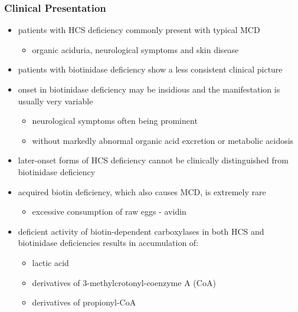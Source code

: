 \documentclass{scrartcl}
\begin{document}
\subsubsection{Clinical Presentation}
\label{sec:orgd598a20}
\begin{itemize}
\item patients with HCS deficiency commonly present with typical MCD
\begin{itemize}
\item organic aciduria, neurological symptoms and skin
disease
\end{itemize}
\item patients with biotinidase deficiency show a less consistent clinical
picture
\item onset in biotinidase deficiency may be insidious and the
manifestation is usually very variable
\begin{itemize}
\item neurological symptoms often being prominent
\item without markedly abnormal organic acid excretion or metabolic
acidosis
\end{itemize}
\item later-onset forms of HCS deficiency cannot be clinically
distinguished from biotinidase deficiency

\item acquired biotin deficiency, which also causes MCD, is extremely rare
\begin{itemize}
\item excessive consumption of raw eggs - avidin
\end{itemize}

\item deficient activity of biotin-dependent carboxylases in both HCS and
biotinidase deficiencies results in accumulation of:
\begin{itemize}
\item lactic acid
\item derivatives of 3-methylcrotonyl-coenzyme A (CoA)
\item derivatives of propionyl-CoA
\end{itemize}
\end{itemize}
\end{document}
